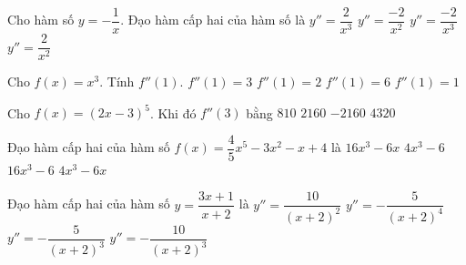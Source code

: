 \begin{ex}%
	Cho hàm  số $y=-\dfrac{1}{x}$. Đạo hàm cấp hai của hàm số là
	 \choice
		{$y''=\dfrac{2}{x^3}$} 
		 {$y''=\dfrac{-2}{x^2}$}
		{\True $y''=\dfrac{-2}{x^3}$} 
		 {$y''=\dfrac{2}{x^2}$}
\end{ex}

\begin{ex}%
	Cho $f(x)=x^3$.  Tính $f''(1)$.
	\choice 
		 {$f''(1)=3$}
		 {$f''(1)=2$}
		{\True $f''(1)=6$} 
		{$f''(1)=1$} 
\end{ex}

\begin{ex}%
	Cho $f(x)=(2x-3)^5$. Khi  đó $f''(3)$ bằng
	\choice 
		{$810$} 
		{\True  $2160$}
		{$-2160$} 
		{$4320$} 
\end{ex}

\begin{ex}%
	Đạo hàm cấp hai của hàm  số $f(x)=\dfrac{4}{5}x^5-3x^2-x+4$ là
	 \choice
		{$16x^3-6x$} 
		{$4x^3-6$} 
		{\True  $16x^3-6$}
		{$4x^3-6x$} 
\end{ex}

\begin{ex}%
	Đạo hàm cấp hai của hàm số  $ y=\dfrac{3x+1}{x+2}$ là
	 \choice
		 {$y''=\dfrac{10}{\left(x+2\right)^2}$}
		 {$y''=-\dfrac{5}{\left(x+2\right)^4}$}
		 {$y''=-\dfrac{5}{\left(x+2\right)^3}$}
		 {\True $y''=-\dfrac{10}{\left(x+2\right)^3}$}
\end{ex}

